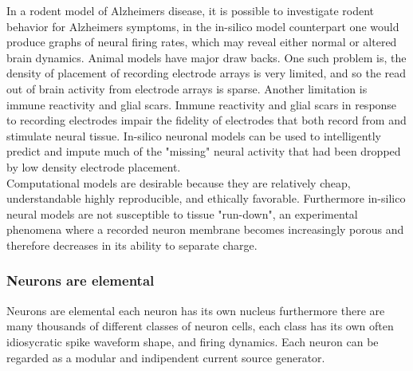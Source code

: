 In a rodent model of Alzheimers disease, it is possible to investigate rodent behavior for Alzheimers symptoms, in the in-silico model counterpart one would produce graphs of neural firing rates, which may reveal either normal or altered brain dynamics. Animal models have major draw backs. One such problem is, the density of placement of recording electrode arrays is very limited, and so the read out of brain activity from electrode arrays is sparse. Another limitation is immune reactivity and glial scars. Immune reactivity and glial scars in response to recording electrodes impair the fidelity of electrodes that both record from and stimulate neural tissue. In-silico neuronal models can be used to intelligently predict and impute much of the "missing" neural activity that had been dropped by low density electrode placement.\\

Computational models are desirable because they are relatively cheap, understandable highly reproducible, and ethically favorable. Furthermore in-silico neural models are not susceptible to tissue "run-down", an experimental phenomena where a recorded neuron membrane becomes increasingly porous and therefore decreases in its ability to separate charge.%

\subsubsection{Neurons are elemental}%
Neurons are elemental each neuron has its own nucleus furthermore there are many thousands of different classes of neuron cells, each class has its own often idiosycratic spike waveform shape, and firing dynamics. Each neuron can be regarded as a modular and indipendent current source generator.\\
\\

